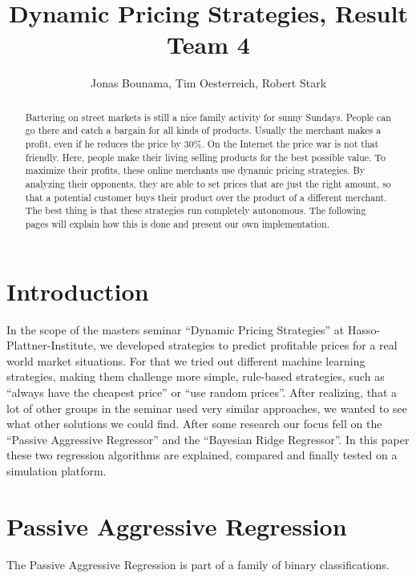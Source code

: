 \documentclass[sigconf]{acmart}
\title{Dynamic Pricing Strategies, Result Team 4}
\author {Jonas Bounama, Tim Oesterreich, Robert Stark}
\date{}
\begin{document}
\begin{abstract}
Bartering on street markets is still a nice family activity for sunny Sundays. People can go there and catch a bargain for all kinds of products. Usually the merchant makes a profit, even if he reduces the price by 30\%. On the Internet the price war is not that friendly. Here, people make their living selling products for the best possible value. To maximize their profits, these online merchants use dynamic pricing strategies. By analyzing their opponents, they are able to set prices that are just the right amount, so that a potential customer buys their product over the product of a different merchant. The best thing is that these strategies run completely autonomous. The following pages will explain how this is done and present our own implementation.
\end{abstract}
\maketitle

\section*{Introduction}
In the scope of the masters seminar ``Dynamic Pricing Strategies'' at Hasso-Plattner-Institute, we developed strategies to predict profitable prices for a real world market situations. For that we tried out different machine learning strategies, making them challenge more simple, rule-based strategies, such as ``always have the cheapest price'' or ``use random prices''. After realizing, that a lot of other groups in the seminar used very similar approaches, we wanted to see what other solutions we could find. After some research our focus fell on the ``Passive Aggressive Regressor'' and the ``Bayesian Ridge Regressor''. In this paper these two regression algorithms are explained, compared and finally tested on a simulation platform.

\section*{Passive Aggressive Regression}
The Passive Aggressive Regression is part of a family of binary classifications.
\end{document}
